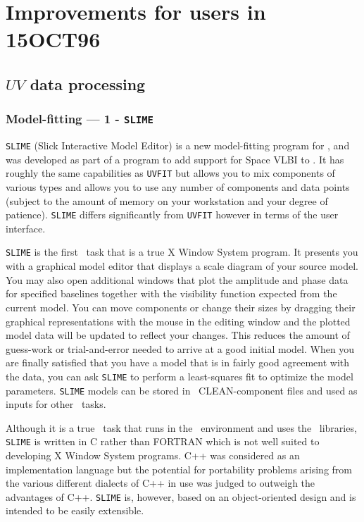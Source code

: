 \section{Improvements for users in 15OCT96}

\subsection{$UV$ data processing}

\subsubsection{Model-fitting --- 1 - {\tt SLIME}}

{\tt SLIME} (Slick Interactive Model Editor) is a new model-fitting
program for \AIPS, and was developed as part of a program to add
support for Space VLBI to \AIPS. It has roughly the same capabilities
as {\tt UVFIT} but allows you to mix components of various types and
allows you to use any number of components and data points (subject to
the amount of memory on your workstation and your degree of patience).
{\tt SLIME} differs significantly from {\tt UVFIT} however in terms of the
user interface.

{\tt SLIME} is the first \AIPS\ task that is a true X Window System
program.  It presents you with a graphical model editor that displays
a scale diagram of your source model.  You may also open additional
windows that plot the amplitude and phase data for specified baselines
together with the visibility function expected from the current model.
You can move components or change their sizes by dragging their
graphical representations with the mouse in the editing window and the
plotted model data will be updated to reflect your changes.  This
reduces the amount of guess-work or trial-and-error needed to arrive
at a good initial model.  When you are finally satisfied that you have
a model that is in fairly good agreement with the data, you can ask
{\tt SLIME} to perform a least-squares fit to optimize the model
parameters.  {\tt SLIME} models can be stored in \AIPS\
CLEAN-component files and used as inputs for other \AIPS\ tasks.

Although it is a true \AIPS\ task that runs in the \AIPS\ environment
and uses the \AIPS\ libraries, {\tt SLIME} is written in C rather than
FORTRAN which is not well suited to developing X Window System
programs.  C++ was considered as an implementation language but the
potential for portability problems arising from the various different
dialects of C++ in use was judged to outweigh the advantages of C++.
{\tt SLIME} is, however, based on an object-oriented design and is intended
to be easily extensible.

